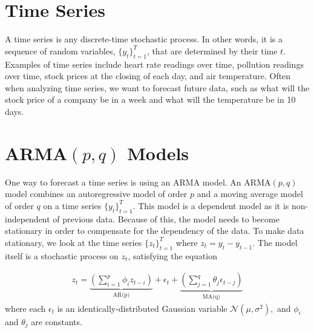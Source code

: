 \label{lab:arma}

\section*{Time Series}


A time series is any discrete-time stochastic process.  
In other words, it is a sequence of random variables, $\{y_t\}_{t=1}^T$, that are determined by their time $t$.  
Examples of time series include heart rate readings over time, pollution readings over time, stock prices at the closing of each day, and air temperature.
Often when analyzing time series, we want to forecast future data, such as what will the stock price of a company be in a week and what will the temperature be in 10 days.

\section*{ARMA$(p,q)$ Models}

One way to forecast a time series is using an ARMA model.
An $\text{ARMA}(p,q)$ model combines an autoregressive model of order $p$ and a moving average model of order $q$ on a time series $\{y_t\}_{t = 1}^T$.
This model is a dependent model as it is non-independent of previous data.
Because of this, the model needs to become stationary in order to compensate for the dependency of the data.
To make data stationary, we look at the time series $\{z_t\}_{t=1}^T$ where $z_t=y_t-y_{t-1}$.
The model itself is a stochastic process on $z_t$, satisfying the equation

\begin{align}
    \label{eq:arma:def}
    z_t =\underbrace{\left(\sum_{i=1}^p \phi_{i}z_{t - i}\right)}_\text{AR(p)} + \epsilon_t +
    \underbrace{\left(\sum_{j=1}^{q} \theta_{j}\epsilon_{t-j} \right)}_\text{MA(q)}
\end{align}
where each $\epsilon_t$ is an identically-distributed Gaussian variable $\mathscr{N}(\mu,\sigma^2),$ and $\phi_i$ and $\theta_j$ are constants.


